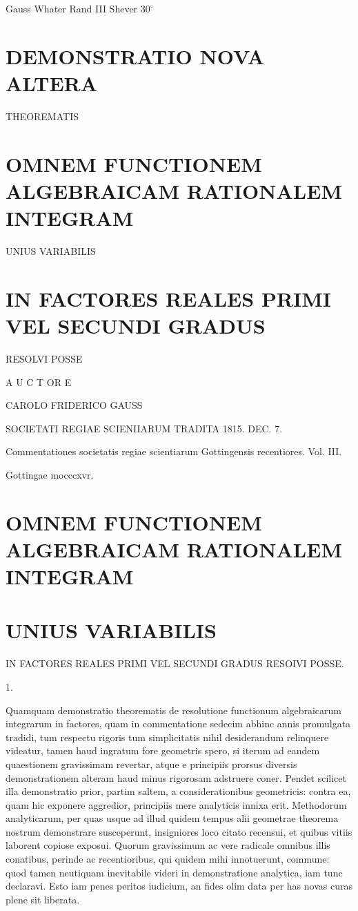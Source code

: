 \documentclass[10pt]{article}
\begin{document}
Gauss Whater Rand III Shever \(30^{\circ}\)

\section*{DEMONSTRATIO NOVA ALTERA}
THEOREMATIS

\section*{OMNEM FUNCTIONEM ALGEBRAICAM RATIONALEM INTEGRAM}
UNIUS VARIABILIS

\section*{IN FACTORES REALES PRIMI VEL SECUNDI GRADUS}
RESOLVI POSSE

A U C T OR E

CAROLO FRIDERICO GAUSS

SOCIETATI REGIAE SCIENIIARUM TRADITA 1815. DEC. 7.

Commentationes societatis regiae scientiarum Gottingensis recentiores. Vol. III.

Gottingae mocccxvr.

\section*{OMNEM FUNCTIONEM ALGEBRAICAM RATIONALEM INTEGRAM}
\section*{UNIUS VARIABILIS}
IN FACTORES REALES PRIMI VEL SECUNDI GRADUS RESOIVI POSSE.

1.

Quamquam demonstratio theorematis de resolutione functionum algebraicarum integrarum in factores, quam in commentatione sedecim abhinc annis promulgata tradidi, tum respectu rigoris tum simplicitatis nihil desiderandum relinquere videatur, tamen haud ingratum fore geometris spero, si iterum ad eandem quaestionem gravissimam revertar, atque e principiis prorsus diversis demonstrationem alteram haud minus rigorosam adstruere coner. Pendet scilicet illa demonstratio prior, partim saltem, a considerationibus geometricis: contra ea, quam hic exponere aggredior, principiis mere analyticis innixa erit. Methodorum analyticarum, per quas usque ad illud quidem tempus alii geometrae theorema nostrum demonstrare susceperunt, insigniores loco citato recensui, et quibus vitiis laborent copiose exposui. Quorum gravissimum ac vere radicale omnibus illis conatibus, perinde ac recentioribus, qui quidem mihi innotuerunt, commune: quod tamen neutiquam inevitabile videri in demonstratione analytica, iam tunc declaravi. Esto iam penes peritos iudicium, an fides olim data per has novas curas plene sit liberata.
\end{document}
